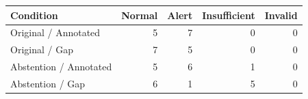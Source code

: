 \begin{tabular}{lrrrr}\toprule
Condition & Normal & Alert & Insufficient & Invalid\\\midrule
Original / Annotated & 5 & 7 & 0 & 0\\
Original / Gap & 7 & 5 & 0 & 0\\
Abstention / Annotated & 5 & 6 & 1 & 0\\
Abstention / Gap & 6 & 1 & 5 & 0\\
\bottomrule\end{tabular}
